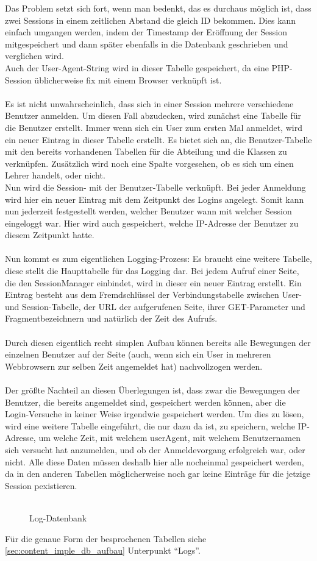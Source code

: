 Das Problem setzt sich fort, wenn man bedenkt, das es durchaus möglich ist, dass zwei Sessions in einem zeitlichen Abstand die gleich ID bekommen. Dies kann einfach umgangen werden, indem der Timestamp der Eröffnung der Session mitgespeichert und dann später ebenfalls in die Datenbank geschrieben und verglichen wird.\\
Auch der User-Agent-String wird in dieser Tabelle gespeichert, da eine PHP-Session üblicherweise fix mit einem Browser verknüpft ist.\\
\\
Es ist nicht unwahrscheinlich, dass sich in einer Session mehrere verschiedene Benutzer anmelden. Um diesen Fall abzudecken, wird zunächst eine Tabelle für die Benutzer erstellt. Immer wenn sich ein User zum ersten Mal anmeldet, wird ein neuer Eintrag in dieser Tabelle erstellt. Es bietet sich an, die Benutzer-Tabelle mit den bereits vorhandenen Tabellen für die Abteilung und die Klassen zu verknüpfen. Zusätzlich wird noch eine Spalte vorgesehen, ob es sich um einen Lehrer handelt, oder nicht.\\
Nun wird die Session- mit der Benutzer-Tabelle verknüpft. Bei jeder Anmeldung wird hier ein neuer Eintrag mit dem Zeitpunkt des Logins angelegt. Somit kann nun jederzeit festgestellt werden, welcher Benutzer wann mit welcher Session eingeloggt war. Hier wird auch gespeichert, welche IP-Adresse der Benutzer zu diesem Zeitpunkt hatte.\\
\\
Nun kommt es zum eigentlichen Logging-Prozess: Es braucht eine weitere Tabelle, diese stellt die Haupttabelle für das Logging dar. Bei jedem Aufruf einer Seite, die den SessionManager einbindet, wird in dieser ein neuer Eintrag erstellt. Ein Eintrag besteht aus dem Fremdschlüssel der Verbindungstabelle zwischen User- und Session-Tabelle, der URL der aufgerufenen Seite, ihrer GET-Parameter und Fragmentbezeichnern und natürlich der Zeit des Aufrufs.\\
\\
Durch diesen eigentlich recht simplen Aufbau können bereits alle Bewegungen der einzelnen Benutzer auf der Seite (auch, wenn sich ein User in mehreren Webbrowsern zur selben Zeit angemeldet hat) nachvollzogen werden.\\
\\
Der größte Nachteil an diesen Überlegungen ist, dass zwar die Bewegungen der Benutzer, die bereits angemeldet sind, gespeichert werden können, aber die Login-Versuche in keiner Weise irgendwie gespeichert werden. Um dies zu lösen, wird eine weitere Tabelle eingeführt, die nur dazu da ist, zu speichern, welche IP-Adresse, um welche Zeit, mit welchem userAgent, mit welchem Benutzernamen sich versucht hat anzumelden, und ob der Anmeldevorgang erfolgreich war, oder nicht. Alle diese Daten müssen deshalb hier alle nocheinmal gespeichert werden, da in den anderen Tabellen möglicherweise noch gar keine Einträge für die jetzige Session pexistieren.\\
\\
\begin{figure}[H]
\centering
{}
\caption{Log-Datenbank}
\end{figure}
Für die genaue Form der besprochenen Tabellen siehe \autoref{sec:content_imple_db_aufbau} Unterpunkt \enquote{Logs}.
 

